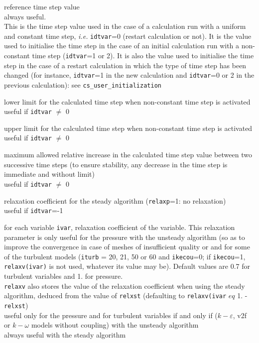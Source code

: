 {reference time step value\\
always useful.\\
This is the time step value used in the case of a calculation run with a
uniform and constant time step, {\em i.e.} {\tt idtvar}=0 (restart calculation
or not). It is the value used to initialise the time step in the case of
an initial calculation run with a non-constant time step
({\tt idtvar}=1 or 2). It is also the value used to initialise the time step
in the case of a restart calculation in which the type of
time step has been changed (for instance, {\tt idtvar}=1 in the new
calculation and {\tt idtvar}=0 or 2 in the previous calculation): see
\texttt{cs\_user\_initialization}}

{lower limit for the calculated time step when non-constant time step is activated\\
useful if {\tt idtvar} $\ne$ 0}

{upper limit for the calculated time step when non-constant time step is activated\\
useful if {\tt idtvar} $\ne$ 0}

{maximum allowed relative increase in the calculated time step value
between two successive time steps (to ensure stability, any decrease in the time step
is immediate and without limit)\\
useful if {\tt idtvar} $\ne$ 0}

{relaxation coefficient for the steady algorithm
 ({\tt relaxp}=1: no relaxation)\\
useful if {\tt idtvar}=-1}

{for each variable {\tt ivar}, relaxation coefficient of the variable.
This relaxation parameter is only useful for the pressure with the unsteady
algorithm (so as to improve the convergence in case of meshes of insufficient
quality or and for some of the turbulent models ({\tt iturb} = 20, 21,
50 or 60 and {\tt ikecou}=0; if {\tt ikecou}=1, {\tt relaxv(ivar)}
is not used, whatever its value may be). Default values are 0.7 for turbulent
variables and 1. for pressure.\\
{\tt relaxv} also stores the value of the relaxation coefficient when using the steady
algorithm, deduced from the value of {\tt relxst} (defaulting to
 {\tt relaxv(ivar} $eq$  {1. - \tt relxst})\\
useful only for the pressure and for turbulent variables
if and only if ($k-\varepsilon$, v2f or $k-\omega$ models without coupling)
 with the unsteady algorithm\\
always useful with the steady algorithm}


